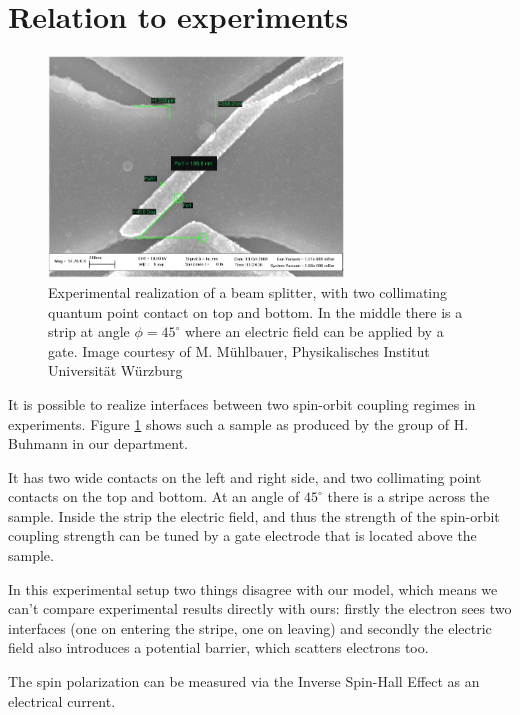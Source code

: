 \section{Relation to experiments}

\begin{figure}[htb]
    \begin{center}
        \includegraphics[width=0.7\textwidth]{beamsplitter2.jpg}
    \end{center}
    \caption{Experimental realization of a beam splitter, with two
        collimating quantum point contact on top and bottom. In the middle
        there is a strip at angle $\phi = 45^\circ$ where an electric field
        can be applied by a gate. Image courtesy of M. Mühlbauer,
        Physikalisches Institut Universität Würzburg}
    \label{fig:experiment}
\end{figure}

It is possible to realize interfaces between two spin-orbit coupling regimes
in experiments. Figure \ref{fig:experiment} shows such a sample as produced
by the group of H. Buhmann in our department.

It has two wide contacts on the left and right side, and two collimating point
contacts on the top and bottom. At an angle of $45^{\circ}$ there is a stripe
across the sample. Inside the strip the electric field, and thus the strength
of the spin-orbit coupling strength can be tuned by a gate electrode that is
located above the sample.

In this experimental setup two things disagree with our model, which
means we can't compare experimental results directly with ours: firstly the
electron sees two interfaces (one on entering the stripe, one on leaving) and
secondly the electric field also introduces a potential barrier, which
scatters electrons too.

The spin polarization can be measured via the Inverse Spin-Hall Effect
\cite{ISHE} as an electrical current.

